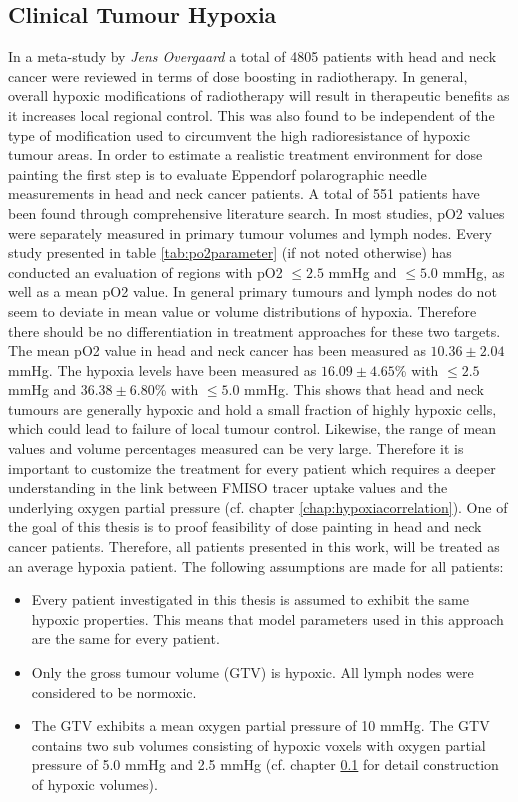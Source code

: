 \subsection{Clinical Tumour Hypoxia}\label{chap:tumourhypoxia}
In a meta-study by \textit{Jens Overgaard} \cite{pmid21511351} a total of 4805 patients with head and neck cancer were reviewed in terms of dose boosting in radiotherapy. In general, overall hypoxic modifications of radiotherapy will result in therapeutic benefits as it increases local regional control. This was also found to be independent of the type of modification used to circumvent the high radioresistance of hypoxic tumour areas. In order to estimate a realistic treatment environment for dose painting the first step is to evaluate Eppendorf polarographic needle measurements in head and neck cancer patients. A total of 551 patients have been found through comprehensive literature search. In most studies, pO2 values were separately measured in primary tumour volumes and lymph nodes. Every study presented in table \ref{tab:po2parameter} (if not noted otherwise) has conducted an evaluation of regions with pO2 $\leq 2.5$ mmHg and $\leq 5.0$ mmHg, as well as a mean pO2 value. In general primary tumours and lymph nodes do not seem to deviate in mean value or volume distributions of hypoxia. Therefore there should be no differentiation in treatment approaches for these two targets. The mean pO2 value in head and neck cancer has been measured as $10.36 \pm 2.04$ mmHg. The hypoxia levels have been measured as $16.09 \pm 4.65$\% with $\leq 2.5$ mmHg and  $36.38 \pm 6.80$\% with $\leq 5.0$ mmHg. This shows that head and neck tumours are generally hypoxic and hold a small fraction of highly hypoxic cells, which could lead to failure of local tumour control. Likewise, the range of mean values and volume percentages measured can be very large. Therefore it is important to customize the treatment for every patient which requires a deeper understanding in the link between FMISO tracer uptake values and the underlying oxygen partial pressure (cf. chapter \ref{chap:hypoxiacorrelation}). One of the goal of this thesis is to proof feasibility of dose painting in head and neck cancer patients. Therefore, all patients presented in this work, will be treated as an average hypoxia patient. The following assumptions are made for all patients:
\begin{itemize}
\item Every patient investigated in this thesis is assumed to exhibit the same hypoxic properties. This means that model parameters used in this approach are the same for every patient.
\item Only the gross tumour volume (GTV) is hypoxic. All lymph nodes were considered to be normoxic.
\item The GTV exhibits a mean oxygen partial pressure of 10 mmHg. The GTV contains two sub volumes consisting of hypoxic voxels with oxygen partial pressure of 5.0 mmHg and 2.5 mmHg (cf. chapter \ref{chap:tumourhypoxia} for detail construction of hypoxic volumes).
\end{itemize}
